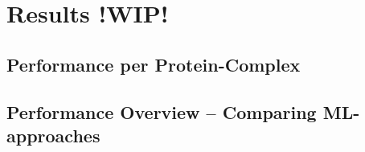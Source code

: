 \chapter{Results !WIP!}
\label{cha:Results}


\section{Performance per Protein-Complex}


\section{Performance Overview -- Comparing ML-approaches}
